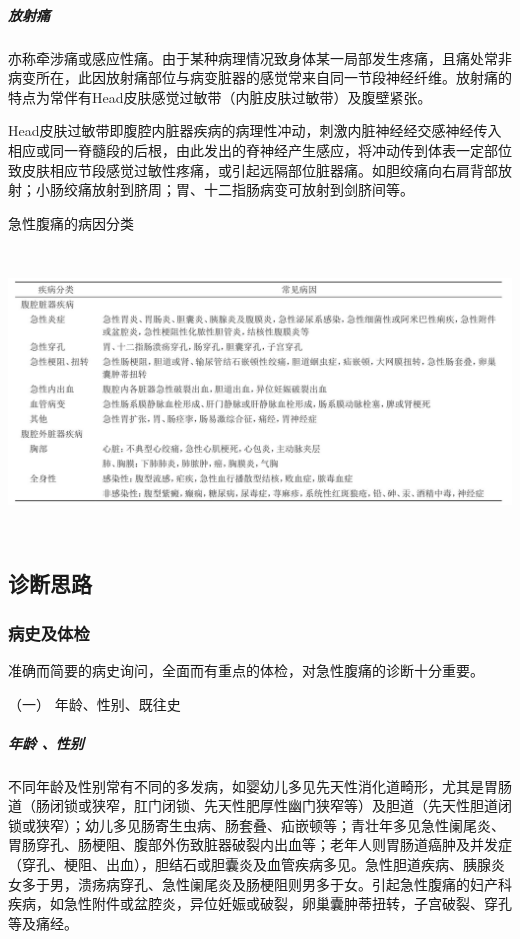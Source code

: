 \subparagraph{放射痛}

亦称牵涉痛或感应性痛。由于某种病理情况致身体某一局部发生疼痛，且痛处常非病变所在，此因放射痛部位与病变脏器的感觉常来自同一节段神经纤维。放射痛的特点为常伴有Head皮肤感觉过敏带（内脏皮肤过敏带）及腹壁紧张。

Head皮肤过敏带即腹腔内脏器疾病的病理性冲动，刺激内脏神经经交感神经传入相应或同一脊髓段的后根，由此发出的脊神经产生感应，将冲动传到体表一定部位致皮肤相应节段感觉过敏性疼痛，或引起远隔部位脏器痛。如胆绞痛向右肩背部放射；小肠绞痛放射到脐周；胃、十二指肠病变可放射到剑脐间等。

\begin{table}[htbp]
\centering
\caption{急性腹痛的病因分类}
\label{tab10-1}
\includegraphics[width=6.67708in,height=3in]{./images/Image00050.jpg}
\end{table}

\subsection{诊断思路}

\subsubsection{病史及体检}

准确而简要的病史询问，全面而有重点的体检，对急性腹痛的诊断十分重要。

\hypertarget{text00026.htmlux5cux23CHP1-10-2-1-1}{}
（一） 年龄、性别、既往史

\subparagraph{年龄 、性别}

不同年龄及性别常有不同的多发病，如婴幼儿多见先天性消化道畸形，尤其是胃肠道（肠闭锁或狭窄，肛门闭锁、先天性肥厚性幽门狭窄等）及胆道（先天性胆道闭锁或狭窄）；幼儿多见肠寄生虫病、肠套叠、疝嵌顿等；青壮年多见急性阑尾炎、胃肠穿孔、肠梗阻、腹部外伤致脏器破裂内出血等；老年人则胃肠道癌肿及并发症（穿孔、梗阻、出血），胆结石或胆囊炎及血管疾病多见。急性胆道疾病、胰腺炎女多于男，溃疡病穿孔、急性阑尾炎及肠梗阻则男多于女。引起急性腹痛的妇产科疾病，如急性附件或盆腔炎，异位妊娠或破裂，卵巢囊肿蒂扭转，子宫破裂、穿孔等及痛经。

